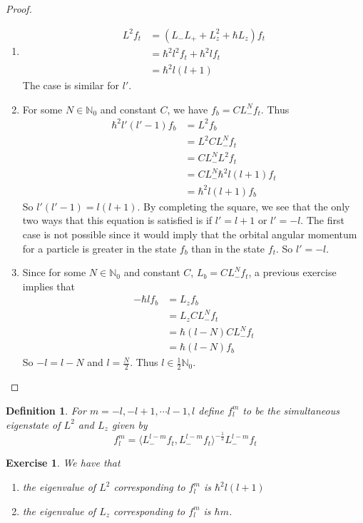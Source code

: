 \documentclass[12pt]{amsart}
\newtheorem{defn}[thm]{Definition}
\newtheorem{ex}[thm]{Exercise}
\renewcommand{\r}{\rangle}
\renewcommand{\l}{\langle}
\newcommand{\N}{\mathbb{N}}
\begin{document}
\begin{proof}\
\begin{enumerate}
\item 
\begin{align*}
L^2 f_t 
&= (L_-L_+ +L_z^2 +\hbar L_z)f_t\\
&= \hbar^2l^2 f_t + \hbar^2l f_t\\
&= \hbar^2l(l+1)
\end{align*}
The case is similar for $l'$.
\item For some $N \in \N_0$ and constant $C$, we have $f_b = C L_-^Nf_t$. Thus 
\begin{align*}
\hbar^2l'(l'-1)f_b
&= L^2 f_b \\
&= L^2 C L_-^Nf_t\\
&= CL_-^NL^2 f_t\\
&= CL_-^N \hbar^2 l (l+1) f_t\\
&= \hbar^2l(l+1)f_b
\end{align*} 
So $l'(l'-1) = l(l+1)$. By completing the square, we see that the only two ways that this equation is satisfied is if $l' = l+1$ or $l' = -l$. The first case is not possible since it would imply that the orbital angular momentum for a particle is greater in the state $f_b$ than in the state $f_t$. So $l' = -l$.  
\item Since for some $N \in \N_0$ and constant $C$, $L_b = CL_-^Nf_t$, a previous exercise implies that 
\begin{align*}
-\hbar lf_b
&= L_z f_b\\
&= L_z C L_-^N f_t\\
&= \hbar (l-N) CL_-^N f_t\\
&= \hbar (l-N) f_b
\end{align*}
So $-l = l-N$ and $l = \frac{N}{2}$. Thus $l \in \frac{1}{2}\N_0$.
\end{enumerate}
\end{proof}

\begin{defn}
For $m = -l, -l+1, \cdots l-1, l$ define $f_l^m$ to be the simultaneous eigenstate of $L^2$ and $L_z$ given by $$f_l^m = \l L_-^{l-m}f_t , L_-^{l-m}f_t \r^{-\frac{1}{2}}  L_-^{l-m}f_t$$ 
\end{defn}

\begin{ex}We have that
\begin{enumerate}
\item the eigenvalue of $L^2$ corresponding to  $f_l^m$ is $\hbar^2 l(l+1)$ 
\item the eigenvalue of $L_z$ corresponding to $f_l^m$ is $\hbar m$.  
\end{enumerate}
\end{ex}
\end{document}
